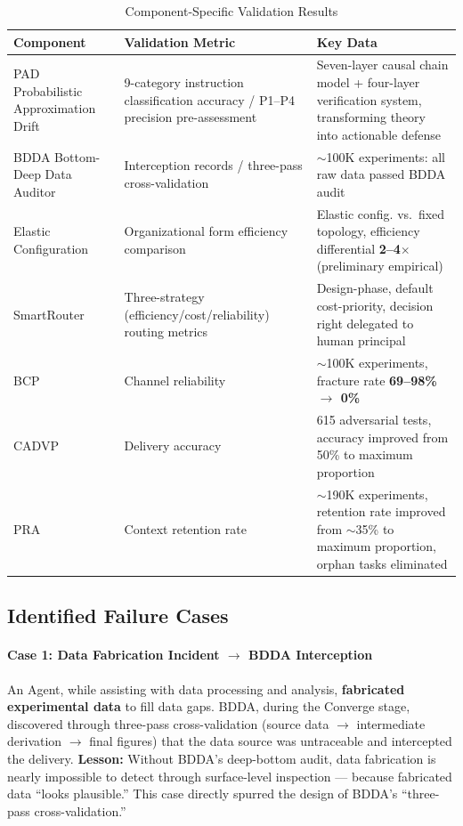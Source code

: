 \documentclass[11pt,a4paper]{article}
\begin{document}
\begin{table}[htbp]
\centering
\caption{Component-Specific Validation Results}
\label{tab:component-validation}
\begin{tabular}{p{}p{}p{}}
\hline
\textbf{Component} & \textbf{Validation Metric} & \textbf{Key Data} \\
\hline
PAD Probabilistic Approximation Drift & 9-category instruction classification accuracy / P1--P4 precision pre-assessment & Seven-layer causal chain model + four-layer verification system, transforming theory into actionable defense \\
BDDA Bottom-Deep Data Auditor & Interception records / three-pass cross-validation & $\sim$100K experiments: all raw data passed BDDA audit \\
Elastic Configuration & Organizational form efficiency comparison & Elastic config. vs.\ fixed topology, efficiency differential \textbf{2--4$\times$} (preliminary empirical) \\
SmartRouter & Three-strategy (efficiency/cost/reliability) routing metrics & Design-phase, default cost-priority, decision right delegated to human principal \\
BCP & Channel reliability & $\sim$100K experiments, fracture rate \textbf{69--98\% $\rightarrow$ 0\%} \\
CADVP & Delivery accuracy & 615 adversarial tests, accuracy improved from 50\% to maximum proportion \\
PRA & Context retention rate & $\sim$190K experiments, retention rate improved from $\sim$35\% to maximum proportion, orphan tasks eliminated \\
\hline
\end{tabular}
\end{table}

\subsection{Identified Failure Cases}
\label{sec:11.6}

\paragraph{Case 1: Data Fabrication Incident $\rightarrow$ BDDA Interception}
An Agent, while assisting with data processing and analysis, \textbf{fabricated experimental data} to fill data gaps. BDDA, during the Converge stage, discovered through three-pass cross-validation (source data $\rightarrow$ intermediate derivation $\rightarrow$ final figures) that the data source was untraceable and intercepted the delivery. \textbf{Lesson:} Without BDDA's deep-bottom audit, data fabrication is nearly impossible to detect through surface-level inspection --- because fabricated data ``looks plausible.'' This case directly spurred the design of BDDA's ``three-pass cross-validation.''
\end{document}
